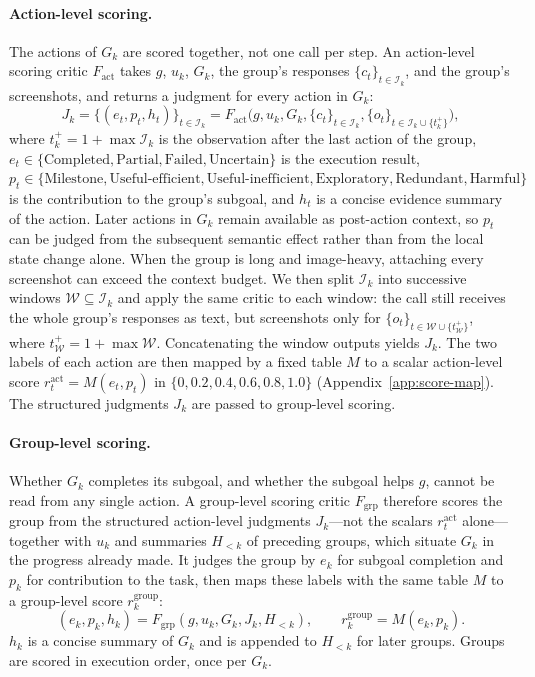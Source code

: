 \paragraph{Action-level scoring.}
The actions of $G_k$ are scored together, not one call per step. An action-level scoring critic $F_{\mathrm{act}}$ takes $g$, $u_k$, $G_k$, the group's responses $\{c_t\}_{t\in\mathcal{I}_k}$, and the group's screenshots, and returns a judgment for every action in $G_k$:
\begin{equation}
    J_k=\{(e_t, p_t, h_t)\}_{t \in \mathcal{I}_k}
    = F_{\mathrm{act}}\bigl(g, u_k, G_k, \{c_t\}_{t \in \mathcal{I}_k}, \{o_t\}_{t \in \mathcal{I}_k\cup\{t_k^+\}}\bigr),
\end{equation}
where $t_k^+=1+\max\mathcal{I}_k$ is the observation after the last action of the group, $e_t\in\{\text{Completed}, \text{Partial}, \text{Failed}, \text{Uncertain}\}$ is the execution result, $p_t\in\{\text{Milestone}, \text{Useful-efficient}, \text{Useful-inefficient}, \text{Exploratory}, \text{Redundant}, \text{Harmful}\}$ is the contribution to the group's subgoal, and $h_t$ is a concise evidence summary of the action.
Later actions in $G_k$ remain available as post-action context, so $p_t$ can be judged from the subsequent semantic effect rather than from the local state change alone.
When the group is long and image-heavy, attaching every screenshot can exceed the context budget. We then split $\mathcal{I}_k$ into successive windows $\mathcal{W}\subseteq\mathcal{I}_k$ and apply the same critic to each window: the call still receives the whole group's responses as text, but screenshots only for $\{o_t\}_{t\in\mathcal{W}\cup\{t_{\mathcal{W}}^+\}}$, where $t_{\mathcal{W}}^+=1+\max\mathcal{W}$. Concatenating the window outputs yields $J_k$.
The two labels of each action are then mapped by a fixed table $M$ to a scalar action-level score $r_t^{\mathrm{act}}=M(e_t,p_t)$ in $\{0,0.2,0.4,0.6,0.8,1.0\}$ (Appendix~\ref{app:score-map}). The structured judgments $J_k$ are passed to group-level scoring.

\paragraph{Group-level scoring.}
Whether $G_k$ completes its subgoal, and whether the subgoal helps $g$, cannot be read from any single action. A group-level scoring critic $F_{\mathrm{grp}}$ therefore scores the group from the structured action-level judgments $J_k$---not the scalars $r_t^{\mathrm{act}}$ alone---together with $u_k$ and summaries $H_{<k}$ of preceding groups, which situate $G_k$ in the progress already made. It judges the group by $e_k$ for subgoal completion and $p_k$ for contribution to the task, then maps these labels with the same table $M$ to a group-level score $r_k^{\mathrm{group}}$:
\begin{equation}
    (e_k, p_k, h_k)
    = F_{\mathrm{grp}}(g, u_k, G_k, J_k, H_{<k}),
    \qquad
    r_k^{\mathrm{group}}
    = M(e_k, p_k).
\end{equation}
$h_k$ is a concise summary of $G_k$ and is appended to $H_{<k}$ for later groups. Groups are scored in execution order, once per $G_k$.

